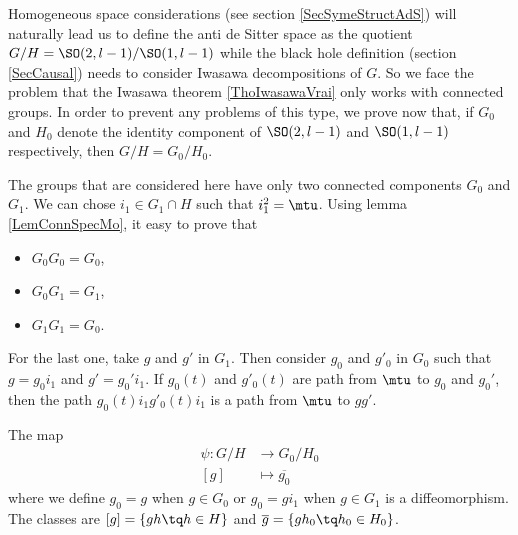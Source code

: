 Homogeneous space considerations (see section \ref{SecSymeStructAdS}) will naturally lead us to define the anti de Sitter space as the quotient $G/H=\SO(2,l-1)/\SO(1,l-1)$ while the black hole definition (section \ref{SecCausal}) needs to consider Iwasawa decompositions of $G$. So we face the problem that the Iwasawa theorem \ref{ThoIwasawaVrai} only works with connected groups. In order to prevent any problems of this type, we prove now that, if $G_0$ and $H_0$ denote the identity component of $\SO(2,l-1)$ and $\SO(1,l-1)$ respectively, then $G/H=G_0/H_0$.

The groups that are considered here have only two connected components $G_0$ and $G_1$. We can chose $i_1\in G_1\cap H$ such that $i_1^2=\mtu$. Using lemma \ref{LemConnSpecMo}, it easy to prove that 
\begin{itemize}
\item $G_0G_0=G_0$,
\item $G_0G_1=G_1$,
\item $G_1G_1=G_0$.
\end{itemize}
For the last one, take $g$ and $g'$ in $G_1$. Then consider $g_0$ and $g'_0$ in $G_0$ such that $g=g_0i_1$ and $g'=g_0'i_1$. If $g_0(t)$ and $g'_0(t)$ are path from $\mtu$ to $g_0$ and $g_0'$, then the path $g_0(t)i_1g'_0(t)i_1$ is a path from $\mtu$ to $gg'$.

\begin{proposition}
The map
\begin{equation}
\begin{aligned}
 \psi\colon G/H&\to G_0/H_0 \\ 
[g]&\mapsto \overline{ g_0 } 
\end{aligned}
\end{equation}
where we define $g_0=g$ when $g\in G_0$ or $g_0=gi_1$ when $g\in G_1$ is a diffeomorphism.  The classes are $[g]=\{ gh\tq h\in H \}$ and $\overline{ g }=\{ gh_0\tq h_0\in H_0 \}$.
\label{PropGHconn}
\end{proposition}

